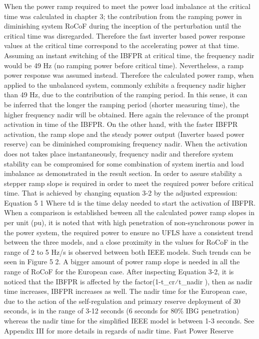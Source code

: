 When the power ramp required to meet the power load imbalance at the critical time was calculated in chapter 3; the contribution from the ramping power in diminishing system RoCoF during the inception of the perturbation until the critical time was disregarded. Therefore the fast inverter based power response values at the critical time correspond to the accelerating power at that time. Assuming an instant switching of the IBFPR at critical time, the frequency nadir would be 49 Hz (no ramping power before critical time). Nevertheless, a ramp power response was assumed instead. Therefore the calculated power ramp, when applied to the unbalanced system, commonly exhibits a frequency nadir higher than 49 Hz, due to the contribution of the ramping period. In this sense, it can be inferred that the longer the ramping period (shorter measuring time), the higher frequency nadir will be obtained. Here again the relevance of the prompt activation in time of the IBFPR. On the other hand, with the faster IBFPR activation, the ramp slope and the steady power output (Inverter based power reserve) can be diminished compromising frequency nadir. 
When the activation does not takes place instantaneously, frequency nadir and therefore system stability can be compromised for some combination of system inertia and load imbalance as demonstrated in the result section. In order to assure stability a stepper ramp slope is required in order to meet the required power before critical time. That is achieved by changing equation 3-2 by the adjusted expression:
Equation 5 1
Where td is the time delay needed to start the activation of IBFPR.
When a comparison is established beween all the calculated power ramp slopes in per unit  (pu), it is noted that with high penetration of non-synchronous power in the power system, the required power to ensure no UFLS have a consistent trend between the three models, and a close proximity in the values for RoCoF in the range of 2 to 5 Hz/s is observed between both IEEE models. Such trends can be seen in Figure 5 2.
A bigger amount of power ramp slope is needed in all the range of RoCoF for the European case. After inspecting Equation 3-2, it is noticed that the IBFPR is affected by the factor(1-t_cr⁄t_nadir ), then as nadir time increases, IBFPR increases as well. The nadir time for the European case, due to the action of the self-regulation and primary reserve deployment of 30 seconds, is in the range of 3-12 seconds (6 seconds for 80\% IBG penetration) whereas the nadir time for the simplified IEEE model is between 1-3 seconds. See Appendix III for more details in regards of nadir time.
Fast Power Reserve

